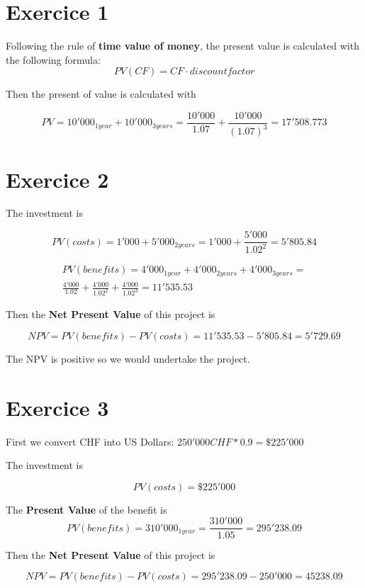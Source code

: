 \documentclass[a4paper,11pt,twoside]{article}
\def \be {\begin{equation}}
\def \ee {\end{equation}}
\begin{document}
\section{Exercice 1}

Following the rule of {\bf time value of money}, the present value is calculated with the following formula:
\be
PV(CF) = CF \cdot discount factor
\ee

Then the present of value is calculated with

\be
PV = 10'000_{1 year} + 10'000_{3 years} = \frac{10'000}{1.07} + \frac{10'000}{(1.07)^3} = 17'508.773
\ee

\section{Exercice 2}

The investment is

\be
PV(costs) = 1'000 + 5'000_{2 years} = 1'000 + \frac{5'000}{1.02^2} = 5'805.84
\ee

\begin{multline}
PV(benefits) = 4'000_{1 year} + 4'000_{2 years} + 4'000_{3 years} = \\ \frac{4'000}{1.02} + \frac{4'000}{1.02^2} + \frac{4'000}{1.02^3} = 11'535.53
\end{multline}

Then the \textbf{Net Present Value} of this project is 

\be
NPV = PV(benefits) - PV(costs) = 11'535.53 - 5'805.84 = 5'729.69
\ee

The NPV is positive so we would undertake the project.


\section{Exercice 3}

First we convert CHF into US Dollars: $250'000 CHF * 0.9 = \$ 225'000$

The investment is

\be
PV(costs) = \$ 225'000 
\ee

The {\bf Present Value} of the benefit is
\be
PV(benefits) = 310'000_{1 year}= \frac{310'000}{1.05}= 295'238.09
\ee

Then the \textbf{Net Present Value} of this project is 

\be
NPV = PV(benefits) - PV(costs) = 295'238.09 - 250'000 = 45238.09
\ee
\end{document}
